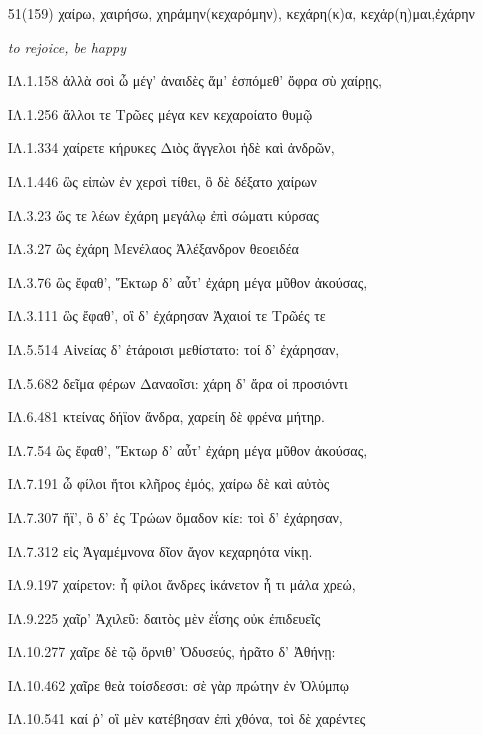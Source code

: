 \begin{enumerate}
{ΙΛ.8.322 βῆ δ' ἰθὺς Τεύκρου, βαλέειν δέ ἑ θυμὸς ἀνώγει.

ΙΛ.9.101 κρηῆναι δὲ καὶ ἄλλῳ, ὅτ' ἄν τινα θυμὸς ἀνώγῃ

ΙΛ.9.219 τοίχου τοῦ ἑτέροιο, θεοῖσι δὲ θῦσαι ἀνώγει

}

\clearpage
\item[\large 51(159)]{\large\g χαίρω, χαιρήσω, χηράμην(κεχαρόμην), κεχάρη(κ)α, κεχάρ(η)μαι,ἐχάρην}

\hspace{0.2cm} \textit{ to rejoice, be happy}

{\g
ΙΛ.1.158 ἀλλὰ σοὶ ὦ μέγ' ἀναιδὲς ἅμ' ἑσπόμεθ' ὄφρα σὺ χαίρῃς,

ΙΛ.1.256 ἄλλοι τε Τρῶες μέγα κεν κεχαροίατο θυμῷ

ΙΛ.1.334 χαίρετε κήρυκες Διὸς ἄγγελοι ἠδὲ καὶ ἀνδρῶν,

ΙΛ.1.446 ὣς εἰπὼν ἐν χερσὶ τίθει, ὃ δὲ δέξατο χαίρων

ΙΛ.3.23 ὥς τε λέων ἐχάρη μεγάλῳ ἐπὶ σώματι κύρσας

ΙΛ.3.27 ὣς ἐχάρη Μενέλαος Ἀλέξανδρον θεοειδέα

ΙΛ.3.76 ὣς ἔφαθ', Ἕκτωρ δ' αὖτ' ἐχάρη μέγα μῦθον ἀκούσας,

ΙΛ.3.111 ὣς ἔφαθ', οἳ δ' ἐχάρησαν Ἀχαιοί τε Τρῶές τε

ΙΛ.5.514 Αἰνείας δ' ἑτάροισι μεθίστατο: τοί δ' ἐχάρησαν,

ΙΛ.5.682 δεῖμα φέρων Δαναοῖσι: χάρη δ' ἄρα οἱ προσιόντι

ΙΛ.6.481 κτείνας δήϊον ἄνδρα, χαρείη δὲ φρένα μήτηρ.

ΙΛ.7.54 ὣς ἔφαθ', Ἕκτωρ δ' αὖτ' ἐχάρη μέγα μῦθον ἀκούσας,

ΙΛ.7.191 ὦ φίλοι ἤτοι κλῆρος ἐμός, χαίρω δὲ καὶ αὐτὸς

ΙΛ.7.307 ἤϊ', ὃ δ' ἐς Τρώων ὅμαδον κίε: τοὶ δ' ἐχάρησαν,

ΙΛ.7.312 εἰς Ἀγαμέμνονα δῖον ἄγον κεχαρηότα νίκῃ.

ΙΛ.9.197 χαίρετον: ἦ φίλοι ἄνδρες ἱκάνετον ἦ τι μάλα χρεώ,

ΙΛ.9.225 χαῖρ' Ἀχιλεῦ: δαιτὸς μὲν ἐΐσης οὐκ ἐπιδευεῖς

ΙΛ.10.277 χαῖρε δὲ τῷ ὄρνιθ' Ὀδυσεύς, ἠρᾶτο δ' Ἀθήνῃ:

ΙΛ.10.462 χαῖρε θεὰ τοίσδεσσι: σὲ γὰρ πρώτην ἐν Ὀλύμπῳ

ΙΛ.10.541 καί ῥ' οἳ μὲν κατέβησαν ἐπὶ χθόνα, τοὶ δὲ χαρέντες

}
\end{enumerate}
